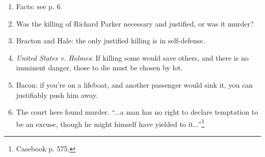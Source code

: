 \begin{enumerate}
    \item Facts: see p. 6.
    \item Was the killing of Richard Parker necessary and justified, or was it murder?
    \item Bracton and Hale: the only justified killing is in self-defense.
    \item \emph{United States v. Holmes}: If killing some would save others, and there is no imminent danger, those to die must be chosen by lot.
    \item Bacon: if you're on a lifeboat, and another passenger would sink it, you can justifiably push him away.
    \item The court here found murder. ``...a man has no right to declare temptation to be an excuse, though he might himself have yielded to it...''\footnote{Casebook p. 575.}
\end{enumerate}
